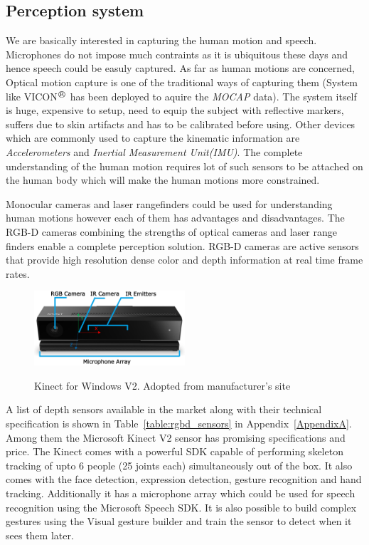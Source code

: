 \subsection{Perception system}
We are basically interested in capturing the human motion and speech. Microphones do not impose much contraints as it is ubiquitous these days and hence speech could be easuly captured. As far as human motions are concerned, Optical motion capture is one of the traditional ways of capturing them (System like VICON$^{\regmark}$ has been deployed to aquire the \emph{MOCAP} data). The system itself is huge, expensive to setup, need to equip the subject with reflective markers, suffers due to skin artifacts and has to be calibrated before using. Other devices which are commonly used to capture the kinematic information are \emph{Accelerometers} and \emph{Inertial Measurement Unit(IMU)}. The complete understanding of the human motion requires lot of such sensors to be attached on the human body which will make the human motions more constrained. 

Monocular cameras and laser rangefinders could be used for understanding human motions however each of them has advantages and disadvantages. The RGB-D cameras combining the strengths of optical cameras and laser range finders enable a complete perception solution. RGB-D cameras\cite{ren2013change} are active sensors that provide high resolution dense color and depth information at real time frame rates.
\begin{figure}[H]
\centering
\includegraphics[width=0.5\textwidth]{assets/kinectv2_parts.eps}
\label{fig:kinectv2}
\caption[Kinect for Windows V2]{Kinect for Windows V2. {Adopted from manufacturer's site}}
\end{figure}
A list of depth sensors available in the market along with their technical specification is shown in Table~\ref{table:rgbd_sensors} in Appendix~\ref{AppendixA}. Among them the Microsoft Kinect V2 \cite{Kinect2014} sensor has promising specifications and price. The Kinect comes with a powerful SDK \cite{KinectSDK2014} capable of performing skeleton tracking of upto 6 people (25 joints each) simultaneously out of the box. It also comes with the face detection, expression detection, gesture recognition and hand tracking. Additionally it has a microphone array which could be used for speech recognition using the Microsoft Speech SDK. It is also possible to build complex gestures using the Visual gesture builder and train the sensor to detect when it sees them later. 

